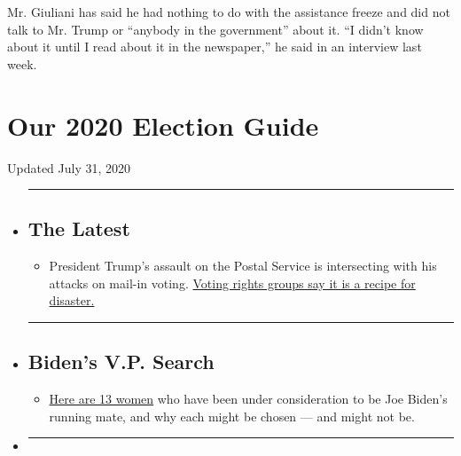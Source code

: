 Mr. Giuliani has said he had nothing to do with the assistance freeze
and did not talk to Mr. Trump or ``anybody in the government'' about it.
``I didn't know about it until I read about it in the newspaper,'' he
said in an interview last week.

\hypertarget{our-2020-election-guide}{%
\section{Our 2020 Election Guide}\label{our-2020-election-guide}}

Updated July 31, 2020

\begin{itemize}
\item
  \begin{center}\rule{0.5\linewidth}{\linethickness}\end{center}

  \hypertarget{the-latest}{%
  \subsection{The Latest}\label{the-latest}}

  \begin{itemize}
  \tightlist
  \item
    President Trump's assault on the Postal Service is intersecting with
    his attacks on mail-in voting.
    \href{https://www.nytimes.com/2020/07/31/us/politics/trump-usps-mail-delays.html?action=click\&pgtype=Article\&state=default\&region=BELOW_MAIN_CONTENT\&context=storylines_guide}{Voting
    rights groups say it is a recipe for disaster.}
  \end{itemize}
\item
  \begin{center}\rule{0.5\linewidth}{\linethickness}\end{center}

  \hypertarget{bidens-vp-search}{%
  \subsection{Biden's V.P. Search}\label{bidens-vp-search}}

  \begin{itemize}
  \tightlist
  \item
    \href{https://www.nytimes.com/article/biden-vice-president-2020.html?action=click\&pgtype=Article\&state=default\&region=BELOW_MAIN_CONTENT\&context=storylines_guide}{Here
    are 13 women} who have been under consideration to be Joe Biden's
    running mate, and why each might be chosen --- and might not be.
  \end{itemize}
\item
  \begin{center}\rule{0.5\linewidth}{\linethickness}\end{center}


\end{itemize}
